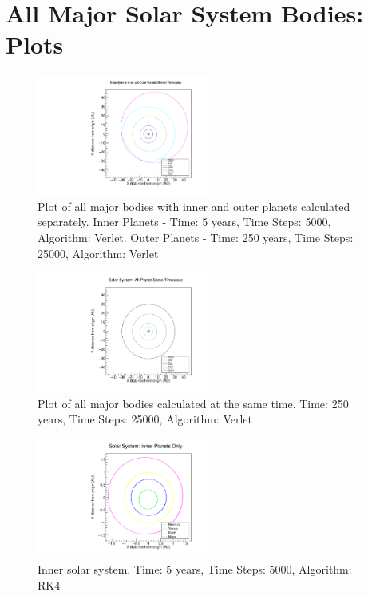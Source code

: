 \documentclass[a4paper,12pt]{report}
\begin{document}
 \chapter{All Major Solar System Bodies: Plots}
   \begin{figure}
 \centering
   \includegraphics[width=0.5\textwidth]{all_bodies_inner_outer_sep_Verlet.pdf}
  \caption{Plot of all major bodies with inner and outer planets calculated separately. Inner Planets - Time: 5 years, Time Steps: 5000, Algorithm: Verlet. Outer Planets - Time: 250 years, Time Steps: 25000, Algorithm: Verlet}
  \label{fig:all_bodies_inner_outer_sep_Verlet}
 \end{figure}

 \begin{figure}
 \centering
   \includegraphics[width=0.5\textwidth]{all_bodies_same_time_Verlet.pdf}
  \caption{Plot of all major bodies calculated at the same time. Time: 250 years, Time Steps: 25000, Algorithm: Verlet}
  \label{fig:all_bodies_same_time_Verlet}
 \end{figure}
 
  \begin{figure}
 \centering
   \includegraphics[width=0.5\textwidth]{inner_only_RK4.pdf}
  \caption{Inner solar system. Time: 5 years, Time Steps: 5000, Algorithm: RK4}
  \label{fig:inner_only_RK4}
 \end{figure}
 
\end{document}

